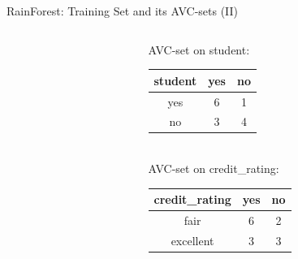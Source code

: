 \begin{frame}{RainForest: Training Set and its AVC-sets (II)}
	\begin{columns}
		\begin{column}{0.6\textwidth}
			\small
			
		\end{column}
		\begin{column}{0.3\textwidth}
			\vspace{-3cm}

			\centering
			AVC-set on student:\\
			\begin{tabular}{|c|c|c|}
				\hline
				student & yes & no \\\hline
				yes     & 6   & 1  \\\hline
				no      & 3   & 4  \\\hline
			\end{tabular}\\[1cm]
			AVC-set on credit\_rating:\\
			\begin{tabular}{|c|c|c|}
				\hline
				credit\_rating & yes & no \\\hline
				fair           & 6   & 2  \\\hline
				excellent      & 3   & 3  \\\hline
			\end{tabular}
		\end{column}
	\end{columns}
\end{frame}

